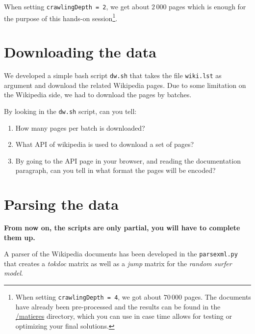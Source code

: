 \documentclass[mathserif, 11pt,c]{article}
\begin{document}
When setting \texttt{crawlingDepth = 2}, we get about $2\,000$ pages which is enough for the purpose of this hands-on session\footnote{When setting \texttt{crawlingDepth = 4}, we got about $70\,000$ pages. The documents have already been pre-processed and the results can be found in the \url{/matieres} directory, which you can use in case time allows for testing or optimizing your final solutions.}.

\section{Downloading the data}

We developed a simple bash script \texttt{dw.sh} that takes the file \texttt{wiki.lst} as argument and download the related Wikipedia pages. Due to some limitation on the Wikipedia side, we had to download the pages by batches.

By looking in the \texttt{dw.sh} script, can you tell:
\begin{enumerate}[label=\textbf{Q\thesection.\arabic*}]
	\item How many pages per batch is downloaded?
	\item What API of wikipedia is used to download a set of pages?
	\item By going to the API page in your browser, and reading the documentation paragraph, can you tell in what format the pages will be encoded?
\end{enumerate}


\section{Parsing the data}

\textbf{From now on, the scripts are only partial, you will have to complete them up.}


A parser of the Wikipedia documents has been developed in the \texttt{parsexml.py} that creates a \textit{tokdoc} matrix as well as a \textit{jump} matrix for the \textit{random surfer model}.
\end{document}
